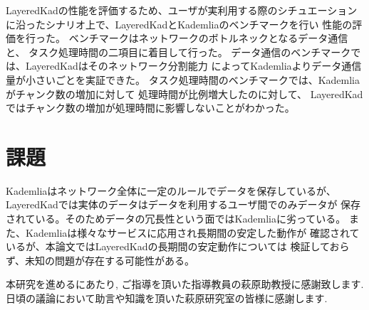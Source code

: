 \documentclass[sotsuron]{jcsie}
\begin{document}
LayeredKadの性能を評価するため、ユーザが実利用する際のシチュエーション
に沿ったシナリオ上で、LayeredKadとKademliaのベンチマークを行い
性能の評価を行った。
ベンチマークはネットワークのボトルネックとなるデータ通信と、
タスク処理時間の二項目に着目して行った。
データ通信のベンチマークでは、LayeredKadはそのネットワーク分割能力
によってKademliaよりデータ通信量が小さいごとを実証できた。
タスク処理時間のベンチマークでは、Kademliaがチャンク数の増加に対して
処理時間が比例増大したのに対して、
LayeredKadではチャンク数の増加が処理時間に影響しないことがわかった。

\section{課題}
Kademliaはネットワーク全体に一定のルールでデータを保存しているが、
LayeredKadでは実体のデータはデータを利用するユーザ間でのみデータが
保存されている。そのためデータの冗長性という面ではKademliaに劣っている。
また、Kademliaは様々なサービスに応用され長期間の安定した動作が
確認されているが、本論文ではLayeredKadの長期間の安定動作については
検証しておらず、未知の問題が存在する可能性がある。

\begin{acknowledgment}
	本研究を進めるにあたり, ご指導を頂いた指導教員の萩原助教授に感謝致します.
	日頃の議論において助言や知識を頂いた萩原研究室の皆様に感謝します.
\end{acknowledgment}



\end{document}
